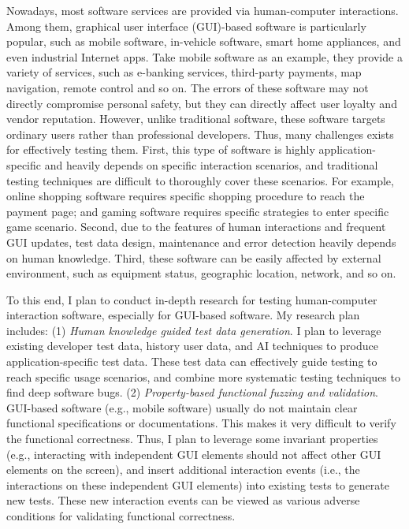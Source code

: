 \documentclass[a4paper]{article}
\begin{document}
Nowadays, most software services are provided via human-computer interactions. Among them, graphical user interface (GUI)-based software is particularly popular, such as mobile software, in-vehicle software, smart home appliances, and even industrial Internet apps. Take mobile software as an example, they provide a variety of services, such as e-banking services, third-party payments, map navigation, remote control and so on. The errors of these software may not directly compromise personal safety, but they can directly affect user loyalty and vendor reputation. However, unlike traditional software, these software targets ordinary users rather than professional developers. Thus, many challenges exists for effectively testing them. First, this type of software is highly application-specific and heavily depends on specific interaction scenarios, and traditional testing techniques are difficult to thoroughly cover these scenarios. For example, online shopping software requires specific shopping procedure to reach the payment page; and gaming software requires specific strategies to enter specific game scenario. 
Second, due to the features of human interactions and frequent GUI updates, test data design, maintenance and error detection heavily depends on human knowledge.
Third, these software can be easily affected by external environment, such as equipment status, geographic location, network, and so on.

To this end, I plan to conduct in-depth research for testing human-computer interaction software, especially for GUI-based software. My research plan includes: 
(1) \emph{Human knowledge guided test data generation}.
I plan to leverage existing developer test data, history user data, and AI techniques to produce application-specific test data. 
These test data can effectively guide testing to reach specific usage scenarios, and combine more systematic testing techniques to find deep software bugs.
(2) \emph{Property-based functional fuzzing and validation}.
GUI-based software (e.g., mobile software) usually do not maintain clear functional specifications or documentations. 
This makes it very difficult to verify the functional correctness.
Thus, I plan to leverage some invariant properties (e.g., interacting with independent GUI elements should not affect other GUI elements on the screen), and insert additional interaction events (i.e., the interactions on these independent GUI elements) into existing tests to generate new tests. These new interaction events can be viewed as various adverse conditions for validating functional correctness.
\end{document}
